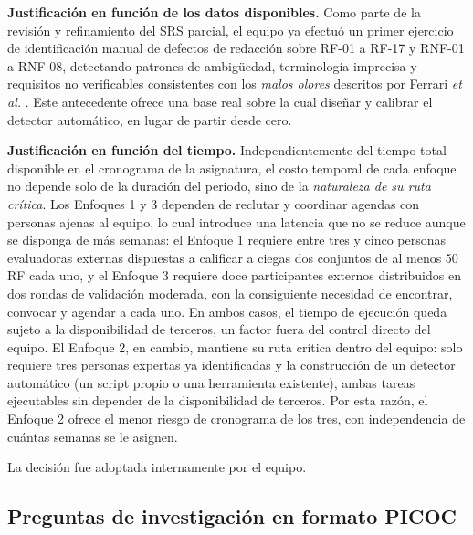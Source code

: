 \documentclass[journal,onecolumn]{IEEEtran}
\begin{document}
	\textbf{Justificación en función de los datos disponibles.} Como parte de la
	revisión y refinamiento del SRS parcial, el equipo ya efectuó un primer
	ejercicio de identificación manual de defectos de redacción sobre RF-01 a
	RF-17 y RNF-01 a RNF-08, detectando patrones de ambigüedad, terminología
	imprecisa y requisitos no verificables consistentes con los \emph{malos
		olores} descritos por Ferrari \emph{et al.} \cite{ferrari2016}. Este
	antecedente ofrece una base real sobre la cual diseñar y calibrar el
	detector automático, en lugar de partir desde cero.
	
	\textbf{Justificación en función del tiempo.} Independientemente del tiempo
	total disponible en el cronograma de la asignatura, el costo temporal de
	cada enfoque no depende solo de la duración del periodo, sino de la
	\emph{naturaleza de su ruta crítica}. Los Enfoques 1 y 3 dependen de
	reclutar y coordinar agendas con personas ajenas al equipo, lo cual introduce
	una latencia que no se reduce aunque se disponga de más semanas: el
	Enfoque 1 requiere entre tres y cinco personas evaluadoras externas
	dispuestas a calificar a ciegas dos conjuntos de al menos 50 RF cada uno, y
	el Enfoque 3 requiere doce participantes externos distribuidos en dos rondas
	de validación moderada, con la consiguiente necesidad de encontrar,
	convocar y agendar a cada uno. En ambos casos, el tiempo de ejecución queda
	sujeto a la disponibilidad de terceros, un factor fuera del control directo
	del equipo. El Enfoque 2, en cambio, mantiene su ruta crítica dentro del
	equipo: solo requiere tres personas expertas ya identificadas y la
	construcción de un detector automático (un script propio o una herramienta
	existente), ambas tareas ejecutables sin depender de la disponibilidad de
	terceros. Por esta razón, el Enfoque 2 ofrece el menor riesgo de cronograma
	de los tres, con independencia de cuántas semanas se le asignen.
	
	La decisión fue adoptada internamente por el equipo.
	
	\subsection{Preguntas de investigación en formato PICOC}
	\label{sec:rq}
	
\end{document}
